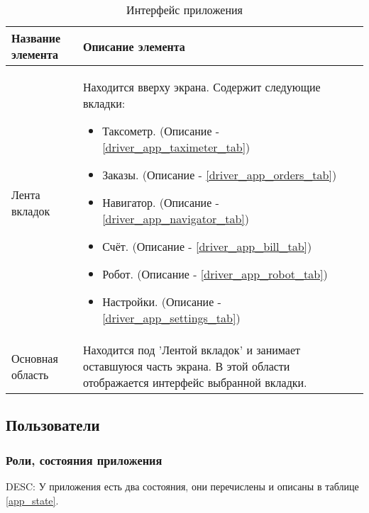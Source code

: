     \begin{table}
    \begin{center}
    \caption {Интерфейс приложения}
    \label{app_interface}
    \setlength{\extrarowheight}{2mm}
      \begin{tabular}{|p{5cm}|p{10cm}|}
        \hline     \textbf{Название элемента}&\textbf{Описание элемента} \\ [2mm]

        \hline   Лента вкладок & Находится вверху экрана. Содержит следующие вкладки: \begin{itemize} \item Таксометр. (Описание - \ref{driver_app_taximeter_tab}) \item Заказы. (Описание - \ref{driver_app_orders_tab}) \item Навигатор. (Описание - \ref{driver_app_navigator_tab}) \item Счёт. (Описание - \ref{driver_app_bill_tab}) \item Робот. (Описание - \ref{driver_app_robot_tab}) \item Настройки. (Описание - \ref{driver_app_settings_tab}) \end{itemize}\\ [2mm]

        \hline   Основная область & Находится под 'Лентой вкладок' и занимает оставшуюся часть экрана. В этой области отображается интерфейс выбранной вкладки.\\ [2mm]

        \hline
      \end{tabular}
    \end{center}
    \end{table}

  \subsection{Пользователи}

      \subsubsection{Роли, состояния приложения}

      		DESC: У приложения есть два состояния, они перечислены и описаны в таблице \ref{app_state}. 

